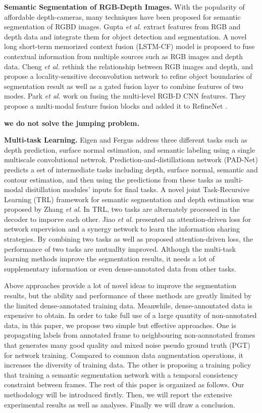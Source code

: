 \noindent \textbf{Semantic Segmentation of RGB-Depth Images.}
%
With the popularity of affordable depth-cameras, many techniques have been proposed for semantic segmentation of RGBD images.
%
Gupta \emph{et al.} \cite{Gupta2014} extract features from RGB and depth data and integrate them for object detection and segmentation.
%
A novel long short-term memorized context fusion (LSTM-CF) model is proposed \cite{Li2016} to fuse contextual information from multiple sources such as RGB images and depth data.
% 
Cheng \emph{et al.} \cite{Cheng2017} rethink the relationship between RGB images and depth, and propose a locality-sensitive deconvolution network to refine object boundaries of segmentation result as well as a gated fusion layer to combine features of two modes.
%
Park \emph{et al.} \cite{Park2017} work on fusing the multi-level RGB-D CNN features.
%
They propose a multi-modal feature fusion blocks and added it to RefineNet \cite{Lin2017}.


\textbf{we do not solve the jumping problem.}

{\bf Multi-task Learning.} 
%
Eigen and Fergus \cite{Eigen2015} address three different tasks such as depth prediction, surface normal estimation, and semantic labeling using a single multiscale convolutional netwrok. 
%
Prediction-and-distillationn network (PAD-Net)\cite{Xu2018} predicts a set of intermediate tasks including depth, surface normal, semantic and contour estimation, and then using the predictions from these tasks as multi-modal disitillation modules' inputs for final tasks.  
%
A novel joint Task-Recursive Learning (TRL) \cite{Zhang2018} framework for semantic segmentation and depth estimation was proposed by Zhang \emph{et al}. 
%
In TRL, two tasks are alternately processed in the decoder to imporve each other.
% 
Jiao \emph{et al.} \cite{Jiao2018} presented an attention-driven loss for network supervision and a synergy network to learn the information sharing strategies. 
%
By combining two tasks as well as proposed attention-driven loss, the performance of two tasks are mutuallty improved.
%
Although the multi-task learning methods improve the segmentation results, it needs a lot of supplementary information or even dense-annotated data from other tasks.

Above approaches provide a lot of novel ideas to improve the segmentation results, but the ability and performance of these methods are greatly limited by the limited dense-annotated training data.
%
Meanwhile, dense-annontated data is expensive to obtain.
%
In order to take full use of a large quantity of non-annotated data, in this paper, we propose two simple but effective approaches. 
%
One is propagating labels from annotated frame to neighbouring non-aonnotated frames that generates many good quality and mixed noise pseudo ground truth (PGT) for network training. 
%
Compared to common data augmentation operations, it increases the diversity of training data.
%
The other is proposing a training policy that training a semantic segmentation network with a temporal consistency constraint between frames. 
%
The rest of this paper is organized as follows.
% 
Our methodology will be introduced firstly.
%
Then, we will report the extensive experimental results as well as analyses. 
%
Finally we will draw a conclusion.
